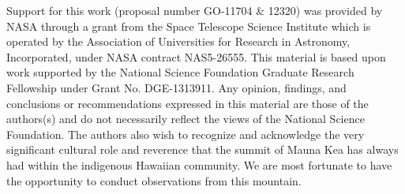 \documentclass[revtex4]{emulateapj}
\begin{document}
\acknowledgments
Support for this work (proposal number GO-11704 \& 12320) was provided by NASA through a grant from the Space Telescope Science Institute which is operated by the Association of Universities for Research in Astronomy, Incorporated, under NASA contract NAS5-26555.  This material is based upon work supported by the National Science Foundation Graduate Research Fellowship under Grant No. DGE-1313911. Any opinion, findings, and conclusions or recommendations expressed in this material are those of the authors(s) and do not necessarily reflect the views of the National Science Foundation.  The authors also wish to recognize and acknowledge the very significant cultural role and reverence that the summit of Mauna Kea has always had within the indigenous Hawaiian community.  We are most fortunate to have the opportunity to conduct observations from this mountain.    
\end{document}

